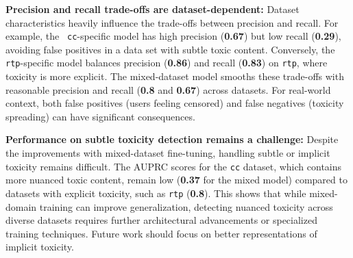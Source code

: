 \textbf{Precision and recall trade-offs are dataset-dependent:}  
Dataset characteristics heavily influence the trade-offs between precision and recall. For example, the \texttt{ cc}-specific model has high precision (\textbf{0.67}) but low recall (\textbf{0.29}), avoiding false positives in a data set with subtle toxic content. Conversely, the \texttt{rtp}-specific model balances precision (\textbf{0.86}) and recall (\textbf{0.83}) on \texttt{rtp}, where toxicity is more explicit. The mixed-dataset model smooths these trade-offs with reasonable precision and recall (\textbf{0.8} and \textbf{0.67}) across datasets. For real-world context, both false positives (users feeling censored) and false negatives (toxicity spreading) can have significant consequences.

\textbf{Performance on subtle toxicity detection remains a challenge:}  
Despite the improvements with mixed-dataset fine-tuning, handling subtle or implicit toxicity remains difficult. The AUPRC scores for the \texttt{cc} dataset, which contains more nuanced toxic content, remain low (\textbf{0.37} for the mixed model) compared to datasets with explicit toxicity, such as \texttt{rtp} (\textbf{0.8}). This shows that while mixed-domain training can improve generalization, detecting nuanced toxicity across diverse datasets requires further architectural advancements or specialized training techniques. Future work should focus on better representations of implicit toxicity.